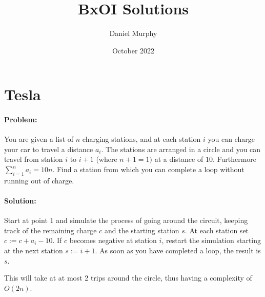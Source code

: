 \documentclass{article}
\title{BxOI Solutions}
\author{Daniel Murphy}
\date{October 2022}
\begin{document}
\section{Tesla}
\paragraph{Problem:} You are given a list of $n$ charging stations, and at each station $i$ you can charge your car to travel a distance $a_i$. The stations are arranged in a circle and you can travel from station $i$ to $i+1$  (where $n+1 = 1)$  at a distance of $10$. Furthermore $\displaystyle \sum_{i=1}^{n} a_i = 10n$. Find a station from which you can complete a loop without running out of charge.

\paragraph{Solution:} Start at point 1 and simulate the process of going around the circuit, keeping track of the remaining charge $c$ and the starting station $s$. At each station set $c := c +  a_i - 10$. If $c$ becomes negative at station $i$, restart the simulation starting at the next station $s := i+1$. As soon as you have completed a loop, the result is $s$.

This will take at at most 2 trips around the circle, thus having a complexity of $O(2n)$.
\end{document}
